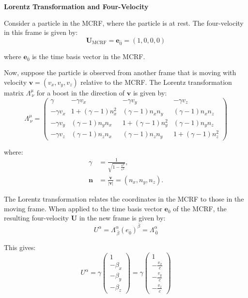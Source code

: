 \documentclass[12pt]{book}
\begin{document}
            \textbf{Lorentz Transformation and Four-Velocity}

            Consider a particle in the MCRF, where the particle is at rest. The four-velocity in this frame is given by:
            \[
            \mathbf{U}_{\text{MCRF}} = \mathbf{e}_{\bar{0}} = (1, 0, 0, 0)
            \]
            
            where \( \mathbf{e}_{\bar{0}} \) is the time basis vector in the MCRF.
            
            Now, suppose the particle is observed from another frame that is moving with velocity \( \mathbf{v} = (v_x, v_y, v_z) \) relative to the MCRF. The Lorentz transformation matrix \( \Lambda^\mu_{\ \nu} \) for a boost in the direction of \( \mathbf{v} \) is given by:
            \[
            \Lambda^\mu_{\ \nu} =
            \begin{pmatrix}
            \gamma & -\gamma v_x & -\gamma v_y & -\gamma v_z \\
            -\gamma v_x & 1 + (\gamma - 1)n_x^2 & (\gamma - 1)n_x n_y & (\gamma - 1)n_x n_z \\
            -\gamma v_y & (\gamma - 1)n_y n_x & 1 + (\gamma - 1)n_y^2 & (\gamma - 1)n_y n_z \\
            -\gamma v_z & (\gamma - 1)n_z n_x & (\gamma - 1)n_z n_y & 1 + (\gamma - 1)n_z^2
            \end{pmatrix}
            \]
            
            where:
            \begin{align*}
            \gamma &= \frac{1}{\sqrt{1 - \frac{v^2}{c^2}}}, \\
            \mathbf{n} &= \frac{\mathbf{v}}{|\mathbf{v}|} = (n_x, n_y, n_z).
            \end{align*}
            
            The Lorentz transformation relates the coordinates in the MCRF to those in the moving frame. When applied to the time basis vector \( \mathbf{e}_{\bar{0}} \) of the MCRF, the resulting four-velocity \( \mathbf{U} \) in the new frame is given by:  
            \[
            U^\alpha = \Lambda^\alpha_{\ \bar{\beta}} (e_{\bar{0}})^{\bar{\beta}} = \Lambda^\alpha_{\ \bar{0}}
            \]
            
            This gives:
            \[
            U^\alpha = \gamma \begin{pmatrix} 1 \\ -\beta_x \\ -\beta_y \\ -\beta_z \end{pmatrix} 
            = \gamma \begin{pmatrix} 1 \\ -\frac{v_x}{c} \\ -\frac{v_y}{c} \\ -\frac{v_z}{c} \end{pmatrix}
            \]
            
\end{document}
